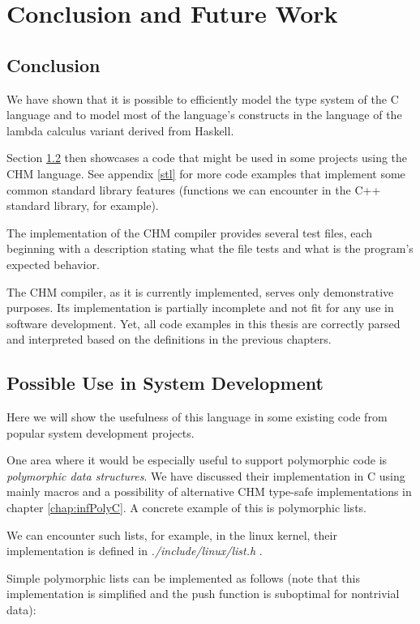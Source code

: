 
\chapter{Conclusion and Future Work}

\section{Conclusion}

We have shown that it is possible to efficiently model the type system of the C language and to model most of the language's constructs in the language of the lambda calculus variant derived from Haskell.

Section \ref{ex:list} then showcases a code that might be used in some projects using the CHM language. See appendix \ref{stl} for more code examples that implement some common standard library features (functions we can encounter in the C++ standard library, for example).

The implementation of the CHM compiler provides several test files, each beginning with a description stating what the file tests and what is the program's expected behavior.

The CHM compiler, as it is currently implemented, serves only demonstrative purposes. Its implementation is partially incomplete and not fit for any use in software development. Yet, all code examples in this thesis are correctly parsed and interpreted based on the definitions in the previous chapters.

\section{Possible Use in System Development}
\label{ex:list}

Here we will show the usefulness of this language in some existing code from popular system development projects.

One area where it would be especially useful to support polymorphic code is \emph{polymorphic data structures}. We have discussed their implementation in C using mainly macros and a possibility of alternative CHM type-safe implementations in chapter \ref{chap:infPolyC}. A concrete example of this is polymorphic lists.

We can encounter such lists, for example, in the linux kernel, their implementation is defined in \emph{./include/linux/list.h} \cite{torvalds2018linux}.

Simple polymorphic lists can be implemented as follows (note that this implementation is simplified and the push function is suboptimal for nontrivial data):

